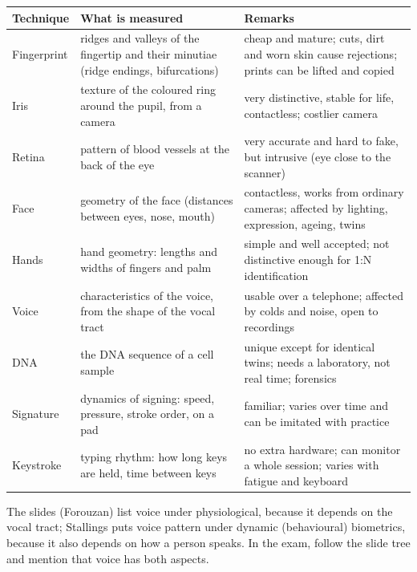 \begin{center}\small
\begin{tabularx}{\textwidth}{@{}l >{\raggedright}X >{\raggedright\arraybackslash}X@{}}
\toprule
Technique & What is measured & Remarks\\
\midrule
Fingerprint & ridges and valleys of the fingertip and their minutiae (ridge endings, bifurcations) & cheap and mature; cuts, dirt and worn skin cause rejections; prints can be lifted and copied\\
Iris & texture of the coloured ring around the pupil, from a camera & very distinctive, stable for life, contactless; costlier camera\\
Retina & pattern of blood vessels at the back of the eye & very accurate and hard to fake, but intrusive (eye close to the scanner)\\
Face & geometry of the face (distances between eyes, nose, mouth) & contactless, works from ordinary cameras; affected by lighting, expression, ageing, twins\\
Hands & hand geometry: lengths and widths of fingers and palm & simple and well accepted; not distinctive enough for 1:N identification\\
Voice & characteristics of the voice, from the shape of the vocal tract & usable over a telephone; affected by colds and noise, open to recordings\\
DNA & the DNA sequence of a cell sample & unique except for identical twins; needs a laboratory, not real time; forensics\\
\midrule
Signature & dynamics of signing: speed, pressure, stroke order, on a pad & familiar; varies over time and can be imitated with practice\\
Keystroke & typing rhythm: how long keys are held, time between keys & no extra hardware; can monitor a whole session; varies with fatigue and keyboard\\
\bottomrule
\end{tabularx}
\end{center}
The slides (Forouzan) list voice under physiological, because it depends on the vocal tract; Stallings puts voice pattern under dynamic (behavioural) biometrics, because it also depends on how a person speaks. In the exam, follow the slide tree and mention that voice has both aspects.

